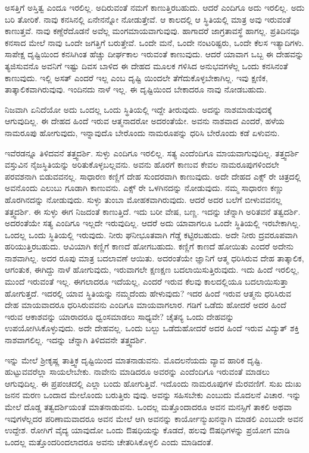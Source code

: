 ಅಸತ್ತಿಗೆ ಅಸ್ತಿತ್ವ ಎಂದೂ ಇರಲಿಲ್ಲ. ಅದಿರುವಂತೆ ನಮಗೆ ಕಾಣುತ್ತಿರಬಹುದು. ಆದರೆ ಎಂದಿಗೂ ಅದು ಇರಲಿಲ್ಲ. ಅದು ಬರಿ ತೋರಿಕೆ. ನಾವು ಕನಸಿನಲ್ಲಿ ಏನೇನನ್ನೋ ನೋಡುತ್ತೇವೆ. ಆ ಕಾಲದಲ್ಲಿ ಆ ಸ್ಥಿತಿಯಲ್ಲಿ ಮಾತ್ರ ಅವು ಇರುವಂತೆ ಕಾಣುತ್ತವೆ. ನಾವು ಕಣ್ದೆರೆದೊಡನೆ ಅವೆಲ್ಲ ಮಂಗಮಾಯವಾಗುವುವು. ಹಾಗಾದರೆ ಜಾಗ್ರತಾವಸ್ಥೆ ಹಾಗಲ್ಲ. ಪ್ರತಿದಿನವೂ ಕನಸಾದ ಮೇಲೆ ನಾವು ಒಂದೇ ಜಗತ್ತಿಗೆ ಬರುತ್ತೇವೆ. ಒಂದೇ ಮನೆ, ಒಂದೇ ನಂಟರಿಷ್ಟರು, ಒಂದೇ ಕೆಲಸ ಇತ್ಯಾದಿಗಳು. ಸಾಪೇಕ್ಷ ದೃಷ್ಟಿಯಿಂದ ಕನಸಿಗಿಂತ ಹೆಚ್ಚು ದೀರ್ಘಕಾಲ ಇರುವಂತೆ ಕಾಣುವುದು. ಆದರೆ ಯಾವಾಗ ಒಬ್ಬ ಈ ದೇಹವನ್ನು ತ್ಯಜಿಸುವನೊ ಅವನಿಗೆ ಇಷ್ಟು ದಿವಸ ಬಾಳಿದ ಈ ದೇಹದ ಮೂಲಕ ಗಳಿಸಿದ ಅನುಭವಗಳೆಲ್ಲ ಒಂದು ಕನಸಿನಂತೆ ಕಾಣುವುದು. ಇಲ್ಲಿ ಅಸತ್ ಎಂದರೆ ಇಲ್ಲ ಎಂಬ ದೃಷ್ಟಿ ಯಿಂದಲೇ ತೆಗೆದುಕೊಳ್ಳಬೇಕಾಗಿಲ್ಲ. ಇವು ಕ್ಷಣಿಕ, ತಾತ್ಕಾಲಿಕವಾಗಿರುವುವು. ಇಂದಿನದು ನಾಳೆ ಇಲ್ಲ. ಈ ದೃಷ್ಟಿಯಿಂದ ಬೇಕಾದರೂ ನಾವು ನೋಡಬಹುದು.

ನಿಜವಾಗಿ ಏನಿದೆಯೋ ಅದು ಒಂದಲ್ಲ ಒಂದು ಸ್ಥಿತಿಯಲ್ಲಿ ಇದ್ದೇ ತೀರುವುದು. ಅದನ್ನು ನಾಶಮಾಡುವುದಕ್ಕೆ ಆಗುವುದಿಲ್ಲ. ಈ ದೇಹದ ಹಿಂದೆ ಇರುವ ಆತ್ಮನಾದರೋ ಅದರಂತೆಯೇ. ಅವನು ನಾಶವಾದ ಎಂದರೆ, ಹಳೆಯ ನಾಮರೂಪು ಹೋಗುವುದು, ಇನ್ನಾವುದೊ ಬೇರೊಂದು ನಾಮರೂಪನ್ನು ಧರಿಸಿ ಬೇರೊಂದು ಕಡೆ ಏಳುವನು.

ಇವೆರಡನ್ನೂ ತಿಳಿದವನೆ ತತ್ತ್ವದರ್ಶಿ. ಸುಳ್ಳು ಎಂದಿಗೂ ಇರಲಿಲ್ಲ. ಸತ್ಯ ಎಂದೆಂದಿಗೂ ಮಾಯವಾಗುವುದಿಲ್ಲ. ತತ್ತ್ವದರ್ಶಿ ವಸ್ತುವಿನ ನೈಜಸ್ಥಿತಿಯನ್ನು ಅರಿತುಕೊಳ್ಳಬಲ್ಲವನು. ಅವನು ಹೊರಗೆ ಕಾಣುವ ಕೇವಲ ನಾಮರೂಪುಗಳಿಂದಲೇ ಪರವಶನಾಗಿ ಬಿಡುವವನಲ್ಲ. ಸಾಧಾರಣ ಕಣ್ಣಿಗೆ ದೇಹ ಸುಂದರವಾಗಿ ಕಾಣುವುದು. ಅದೇ ದೇಹದ ಎಕ್ಸ್ ರೇ ಚಿತ್ರದಲ್ಲಿ ಅವನೊಂದು ಎಲುಬು ಗೂಡಾಗಿ ಕಾಣುವನು. ಎಕ್ಸ್ ರೇ ಒಳಗಿನದನ್ನು ನೋಡುವುದು. ನಮ್ಮ ಸಾಧಾರಣ ಕಣ್ಣು ಹೊರಗಿನದನ್ನು ನೋಡುವುದು. ಸುಳ್ಳು ತುಂಬಾ ಮೋಹಕವಾಗಿರುವುದು. ಆದರೆ ಅದರ ಬಲೆಗೆ ಬೀಳುವವನಲ್ಲ ತತ್ತ್ವದರ್ಶಿ. ಈ ಸುಳ್ಳು ಈಗ ನಿಜದಂತೆ ಕಾಣುತ್ತಿದೆ. ಇದು ಬರೀ ವೇಷ, ಬಣ್ಣ. ಇದನ್ನು ಚೆನ್ನಾಗಿ ಅರಿತವನೆ ತತ್ವದರ್ಶಿ. ಅದರಂತೆಯೇ ಸತ್ಯ ಎಂದಿಗೂ ಇಲ್ಲದೇ ಇರುವುದಿಲ್ಲ. ಆದರೆ ಅದು ಯಾವಾಗಲೂ ಒಂದೇ ಸ್ಥಿತಿಯಲ್ಲಿ ಇರಬೇಕಾಗಿಲ್ಲ. ಒಂದಲ್ಲ ಒಂದು ಸ್ಥಿತಿಯಲ್ಲಿ ಇರುವುದು. ನೀರು ಘನೀಭೂತವಾಗಿ ಗೆಡ್ಡೆ ಕಟ್ಟಿರಬಹುದು. ಅದೇ ನೀರು ದ್ರವರೂಪವಾಗಿ ಹರಿಯುತ್ತಿರಬಹುದು. ಆವಿಯಾಗಿ ಕಣ್ಣಿಗೆ ಕಾಣದೆ ಹೋಗಬಹುದು. ಕಣ್ಣಿಗೆ ಕಾಣದೆ ಹೋಯಿತು ಎಂದರೆ ಅದೇನು ನಾಶವಾಗಿಲ್ಲ. ಅದರ ರೂಪು ಮಾತ್ರ ಬದಲಾವಣೆ ಆಯಿತು. ಅದರಂತೆಯೇ ಜ್ಞಾನಿಗೆ ಆತ್ಮ ಧರಿಸಿರುವ ದೇಹ ತಾತ್ಕಾಲಿಕ, ಆಗಂತುಕ, ಈಗಿದ್ದು ನಾಳೆ ಹೋಗುವುದು, ಇರುವಾಗಲೇ ಕ್ಷಣಕ್ಷಣ ಬದಲಾಯಿಸುತ್ತಿರುವುದು. ಇದು ಹಿಂದೆ ಇರಲಿಲ್ಲ, ಮುಂದೆ ಇರುವಂತೆ ಇಲ್ಲ. ಈಗಲಾದರೂ ಇದೆಯಲ್ಲ, ಎಂದರೆ ಇರುವ ಕೆಲವು ಕಾಲದಲ್ಲಿಯೂ ಬದಲಾಯಿಸುತ್ತಾ ಹೋಗುತ್ತದೆ. ಇದರಲ್ಲಿ ಯಾವ ಸ್ಥಿತಿಯನ್ನು ನಮ್ಮದೆಂದು ಹೇಳುವುದು? ಇದರ ಹಿಂದೆ ಇರುವ ಆತ್ಮನು ಧರಿಸಿರುವ ದೇಹ ಮಾಯವಾದರೂ ಧರಿಸಿರುವವನು ಎಂದಿಗೂ ಮಾಯವಾಗಲಾರ. ಗಡಿಗೆ ಒಡೆದು ಹೋದರೆ ಅದರ ಹಿಂದೆ ಇರುವ ಆಕಾಶವನ್ನು ಯಾರಾದರೂ ಧ್ವಂಸಮಾಡಲು ಸಾಧ್ಯವೇ? ಚೈತನ್ಯ ಒಂದು ದೇಹವನ್ನು ಉಪಯೋಗಿಸಿಕೊಳ್ಳುವುದು. ಅದೇ ದೇಹವಲ್ಲ. ಒಂದು ಬಲ್ಬು ಒಡೆದುಹೋದರೆ ಅದರ ಹಿಂದೆ ಇರುವ ವಿದ್ಯುತ್ ಶಕ್ತಿ ನಾಶವಾಗಲಿಲ್ಲ. ಇದನ್ನು ಚೆನ್ನಾಗಿ ತಿಳಿದವನೇ ತತ್ತ್ವದರ್ಶಿ.

ಇನ್ನು ಮೇಲೆ ಶ್ರೀಕೃಷ್ಣ ತಾತ್ತ್ವಿಕ ದೃಷ್ಟಿಯಿಂದ ಮಾತನಾಡುವನು. ಮೊದಲನೆಯದು ವ್ಯಾವ ಹಾರಿಕ ದೃಷ್ಟಿ. ಹುಟ್ಟುವವರೆಲ್ಲಾ ಸಾಯಲೇಬೇಕು. ನಾವೇನು ಮಾಡಿದರೂ ಅವರನ್ನು ಎಂದೆಂದಿಗೂ ಇರುವಂತೆ ಮಾಡಲು ಆಗುವುದಿಲ್ಲ. ಈ ಪ್ರಪಂಚದಲ್ಲಿ ಎಲ್ಲಾ ಬಂದು ಹೋಗುತ್ತಿವೆ. ಇದೊಂದು ನಾಮರೂಪುಗಳ ಮೆರವಣಿಗೆ. ಸುಖ ದುಃಖ ಜನನ ಮರಣ ಒಂದಾದ ಮೇಲೊಂದು ಬರುತ್ತಿರು ವುವು. ಅವನ್ನು ಸಹಿಸಬೇಕು ಎಂಬುದು ಮೊದಲನೆ ವಿಚಾರ. ಇನ್ನು ಮೇಲೆ ದೊಡ್ಡ ತತ್ವದರ್ಶಿಯಂತೆ ಮಾತನಾಡುವನು. ಒಂದಲ್ಲ ಮತ್ತೊಂದಾದರೂ ಅವನ ಮನಸ್ಸಿಗೆ ತಾಕಲಿ ಅಥವಾ ಇವುಗಳೆಲ್ಲದರ ಪರಿಣಾಮವಾದರೂ ಅವನ ಮೇಲೆ ಆಗಿ ಅವನನ್ನು ಕಾರ್ಯೋನ್ಮುಖನನ್ನಾಗಿ ಮಾಡಲಿ ಎಂಬುದೇ ಅವನ ಉದ್ದೇಶ. ರೋಗಿಗೆ ವೈದ್ಯ ಯಾವುದೋ ಒಂದು ಔಷಧಿಯನ್ನು ಕೊಡದೆ, ಹಲವು ಔಷಧಿಗಳನ್ನು ಪ್ರಯೋಗ ಮಾಡಿ ಒಂದಲ್ಲ ಮತ್ತೊಂದರಿಂದಲಾದರೂ ಅವನು ಚೇತರಿಸಿಕೊಳ್ಳಲಿ ಎಂದು ಮಾಡಿದಂತೆ.

